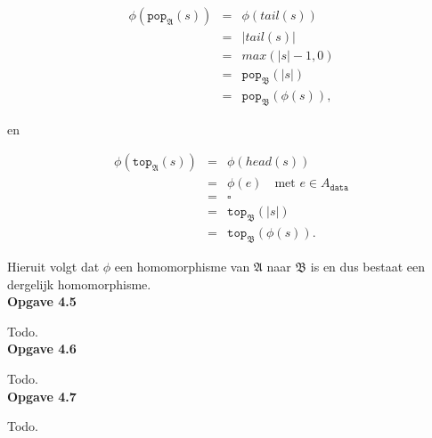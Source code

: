 \documentclass[a4paper,11pt]{article}
\begin{document}
\begin{eqnarray*}
\phi(\texttt{pop}_{\mathfrak{A}}(s)) & = & \phi(tail(s)) \\
                                     & = & |tail(s)| \\
                                     & = & max(|s| - 1, 0) \\
                                     & = & \texttt{pop}_{\mathfrak{B}}(|s|) \\
                                     & = & \texttt{pop}_{\mathfrak{B}}(\phi(s)),
\end{eqnarray*}

en

\begin{eqnarray*}
\phi(\texttt{top}_{\mathfrak{A}}(s)) & = & \phi(head(s)) \\
                                     & = & \phi(e) \quad \text{met $e \in A_{\texttt{data}}$} \\
                                     & = & \square \\
                                     & = & \texttt{top}_{\mathfrak{B}}(|s|) \\
                                     & = & \texttt{top}_{\mathfrak{B}}(\phi(s)).
\end{eqnarray*}

Hieruit volgt dat $\phi$ een homomorphisme van $\mathfrak{A}$ naar
$\mathfrak{B}$ is en dus bestaat een dergelijk homomorphisme.\\[2em]


{\bf Opgave 4.5}

Todo.\\[2em]


{\bf Opgave 4.6}

Todo.\\[2em]


{\bf Opgave 4.7}

Todo.\\[2em]
\end{document}
